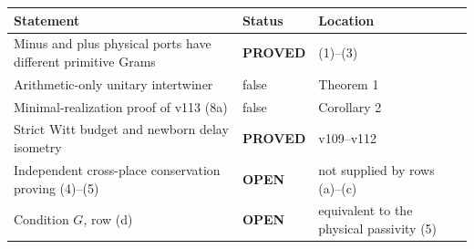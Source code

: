 \documentclass[11pt]{article}
\newcommand{\PROVED}{\textcolor{green!40!black}{\textbf{PROVED}}}
\newcommand{\OPEN}{\textcolor{red!70!black}{\textbf{OPEN}}}
\begin{document}
\begin{center}
\begin{tabular}{>{\raggedright\arraybackslash}p{.56\linewidth}
                >{\centering\arraybackslash}p{.15\linewidth}
                >{\raggedright\arraybackslash}p{.19\linewidth}}
\toprule
Statement & Status & Location \\
\midrule
Minus and plus physical ports have different primitive Grams & \PROVED & (1)--(3) \\
Arithmetic-only unitary intertwiner & false & Theorem 1 \\
Minimal-realization proof of v113 (8a) & false & Corollary 2 \\
Strict Witt budget and newborn delay isometry & \PROVED & v109--v112 \\
Independent cross-place conservation proving (4)--(5) & \OPEN & not supplied by rows (a)--(c) \\
Condition $G$, row (d) & \OPEN & equivalent to the physical passivity (5) \\
\bottomrule
\end{tabular}
\end{center}
\end{document}
